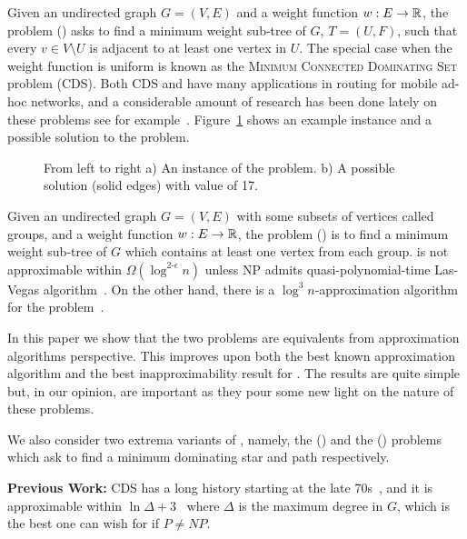 Given an undirected graph $G = (V, E)$ and a weight function $w:E \to \mathbb{R}$, 
the \Problem{} problem (\Prob{}) asks to find a minimum weight sub-tree of $G$, 
$T = (U, F)$, such that every $v \in V \setminus U$ is adjacent to at least one 
vertex in $U$.
The special case when the weight function is uniform is known as the 
\textsc{Minimum Connected Dominating Set} problem (CDS). 
Both CDS and \Prob{} have many applications in routing
for mobile ad-hoc networks, 
and a considerable amount of research has been done lately on these problems
see for example~\cite{%
shin2010approximation%
,cheng2003polynomial%
,das1997routing%
,adasme2016models%
,adasme2017minimum%
,rossi2018properties%
,adasme2018improved%
}.
Figure~\ref{fig:problem} shows an example instance and a possible solution to the problem. 

\begin{figure}
\begin{center}

\end{center}
\caption{\label{fig:problem}
From left to right
a) An instance of the \Problem{} problem.
b) A possible solution (solid edges) with value of 17.
}
\end{figure}

Given an undirected graph $G = (V, E)$ with some subsets of vertices called groups,
and a weight function $w:E \to \mathbb{R}$,
the \ProblemGroup{} problem (\ProbGroup{}) is to find a minimum weight sub-tree
of $G$ which contains at least one vertex from each group.
\ProbGroup{} is not approximable within $ \Omega(\log^{2\textbf{-}\epsilon}n)$
unless NP admits quasi-polynomial-time Las-Vegas
algorithm~\cite{halperin2003polylogarithmic}.
On the other hand, there is a $\log^3 n$-approximation algorithm for the 
problem~\cite{garg2000polylogarithmic}.

In this paper we show that the two problems are equivalents 
from approximation algorithms perspective.
This improves upon both the best known approximation algorithm and the best 
inapproximability result for \Prob{}.
The results are quite simple but, in our opinion, 
are important as they pour some new light on the nature of these problems.
 
We also consider two extrema variants of \Prob{}, namely,
the \ProblemStar{} (\ProbStar{}) and the \ProblemPath{} (\ProbPath{}) 
problems which ask to find a minimum dominating star and path respectively.  

\textbf{Previous Work:}
CDS has a long history starting at the late 70s~\cite{sampathkumar1979connected},
and it is approximable within $\ln\Delta + 3$~\cite{guha1998approximation} 
where $\Delta$ is the maximum degree in $G$,
which is the best one can wish for if $P \neq NP$. 

